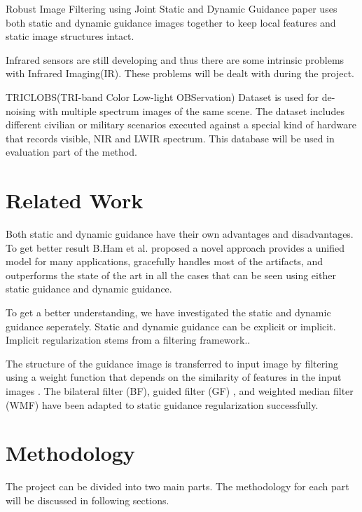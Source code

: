 \documentclass[10pt,twocolumn,letterpaper]{article}
\begin{document}
Robust Image Filtering using Joint Static and Dynamic Guidance\cite{ham2015} paper uses both static and dynamic guidance images together to keep local features and static image structures intact.

Infrared sensors are still developing and thus there are some intrinsic problems with Infrared Imaging(IR). These problems will be dealt with during the project.

TRICLOBS(TRI-band Color Low-light OBServation) Dataset\cite{triclobs} is used for de-noising with multiple spectrum images of the same scene. The dataset includes different civilian or military scenarios executed against a special kind of hardware that records visible, NIR and LWIR spectrum. This database will be used in evaluation part of the method\cite{ham2015}.

\section{Related Work}
Both static and dynamic guidance have their own advantages and disadvantages. To get better result B.Ham et al.\cite{ham2015} proposed a novel approach provides a unified model for many applications, gracefully handles most of the artifacts, and outperforms the state of the art in all the cases that can be seen using either static guidance and dynamic guidance.

To get a better understanding, we have investigated\textsl{} the static and dynamic guidance seperately. Static and dynamic guidance can be explicit or implicit. Implicit regularization stems from a filtering framework.\cite{ham2015}. 

The structure of the guidance image is transferred to input image by filtering using a weight function that depends on the similarity of features in the input images \cite{Kopf:2007:JBU:1275808.1276497}. The bilateral filter (BF)\cite{tomasi1998bilateral}, guided filter (GF) \cite{he2013guided}, and weighted median filter (WMF) \cite{ma2013constant} have been adapted to static guidance regularization successfully.




\section{Methodology}
The project can be divided into two main parts. The methodology for each part will be discussed in following sections.
\end{document}

